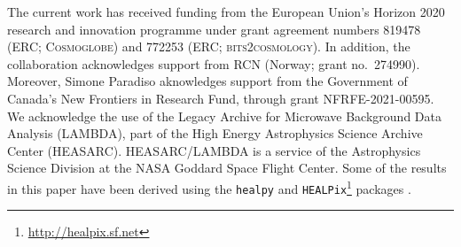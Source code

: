 \begin{acknowledgements}
  The current work has received funding from the European
  Union’s Horizon 2020 research and innovation programme under grant
  agreement numbers 819478 (ERC; \textsc{Cosmoglobe}) and 772253 (ERC;
  \textsc{bits2cosmology}).
  In
  addition, the collaboration acknowledges support from
  RCN (Norway; grant no.\ 274990). Moreover, Simone Paradiso aknowledges
  support from the Government of Canada's New Frontiers in Research Fund,
  through grant NFRFE-2021-00595.
  We acknowledge the use of the Legacy Archive for Microwave Background Data
  Analysis (LAMBDA), part of the High Energy Astrophysics Science Archive Center
  (HEASARC). HEASARC/LAMBDA is a service of the Astrophysics Science Division at
  the NASA Goddard Space Flight Center.  
  Some of the results in this paper have been derived using the \texttt{healpy}
  and \texttt{HEALPix}\footnote{\url{http://healpix.sf.net}} packages
  \citep{gorski2005, Zonca2019}.
\end{acknowledgements}
